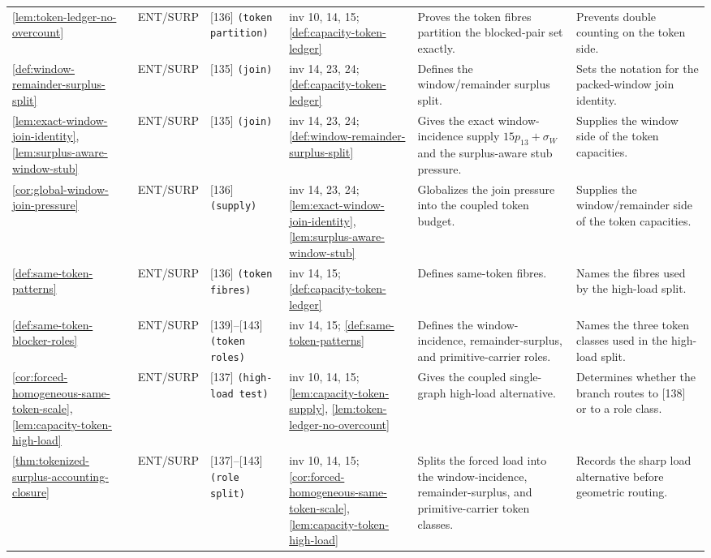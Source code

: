 \documentclass[11pt]{article}
\begin{document}
{\begin{longtable}{L{0.10\textwidth} C{0.045\textwidth} L{0.13\textwidth} L{0.135\textwidth} L{0.28\textwidth} L{0.20\textwidth}}
\cref{lem:token-ledger-no-overcount} & ENT\slash SURP & [136] \texttt{(token partition)} & inv 10, 14, 15; \cref{def:capacity-token-ledger} & Proves the token fibres partition the blocked-pair set exactly. & Prevents double counting on the token side. \\
\cref{def:window-remainder-surplus-split} & ENT\slash SURP & [135] \texttt{(join)} & inv 14, 23, 24; \cref{def:capacity-token-ledger} & Defines the window/remainder surplus split. & Sets the notation for the packed-window join identity. \\
\cref{lem:exact-window-join-identity}, \cref{lem:surplus-aware-window-stub} & ENT\slash SURP & [135] \texttt{(join)} & inv 14, 23, 24; \cref{def:window-remainder-surplus-split} & Gives the exact window-incidence supply \(15p_{13}+\sigma_W\) and the surplus-aware stub pressure. & Supplies the window side of the token capacities. \\
\cref{cor:global-window-join-pressure} & ENT\slash SURP & [136] \texttt{(supply)} & inv 14, 23, 24; \cref{lem:exact-window-join-identity}, \cref{lem:surplus-aware-window-stub} & Globalizes the join pressure into the coupled token budget. & Supplies the window/remainder side of the token capacities. \\
\cref{def:same-token-patterns} & ENT\slash SURP & [136] \texttt{(token fibres)} & inv 14, 15; \cref{def:capacity-token-ledger} & Defines same-token fibres. & Names the fibres used by the high-load split. \\
\cref{def:same-token-blocker-roles} & ENT\slash SURP & [139]--[143] \texttt{(token roles)} & inv 14, 15; \cref{def:same-token-patterns} & Defines the window-incidence, remainder-surplus, and primitive-carrier roles. & Names the three token classes used in the high-load split. \\
\cref{cor:forced-homogeneous-same-token-scale}, \cref{lem:capacity-token-high-load} & ENT\slash SURP & [137] \texttt{(high-load test)} & inv 10, 14, 15; \cref{lem:capacity-token-supply}, \cref{lem:token-ledger-no-overcount} & Gives the coupled single-graph high-load alternative. & Determines whether the branch routes to [138] or to a role class. \\
\cref{thm:tokenized-surplus-accounting-closure} & ENT\slash SURP & [137]--[143] \texttt{(role split)} & inv 10, 14, 15; \cref{cor:forced-homogeneous-same-token-scale}, \cref{lem:capacity-token-high-load} & Splits the forced load into the window-incidence, remainder-surplus, and primitive-carrier token classes. & Records the sharp load alternative before geometric routing. \\

\end{longtable}}
\end{document}
